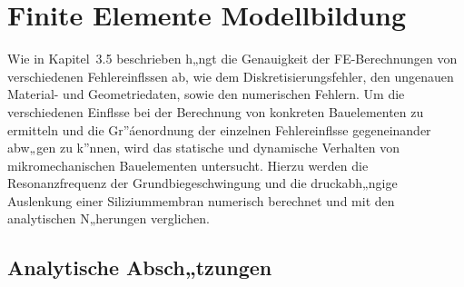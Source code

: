 \section{Finite Elemente Modellbildung}
\label{femodellbildung}

Wie in Kapitel~3.5 beschrieben h„ngt die Genauigkeit der FE-Berechnungen
von verschiedenen Fehlereinflssen ab, wie dem Diskretisierungsfehler,
den ungenauen Material- und Geometriedaten, sowie den numerischen Fehlern.
Um die verschiedenen Einflsse bei der Berechnung von konkreten Bauelementen
zu ermitteln und die Gr”áenordnung der einzelnen Fehlereinflsse
gegeneinander abw„gen zu k”nnen, wird das statische und dynamische
Verhalten von mikromechanischen Bauelementen untersucht. Hierzu werden die
Resonanzfrequenz der Grundbiegeschwingung und die druckabh„ngige Auslenkung
einer Siliziummembran numerisch berechnet und mit den analytischen N„herungen
verglichen.


\subsection{Analytische Absch„tzungen}
\label{abschaetzungen}

